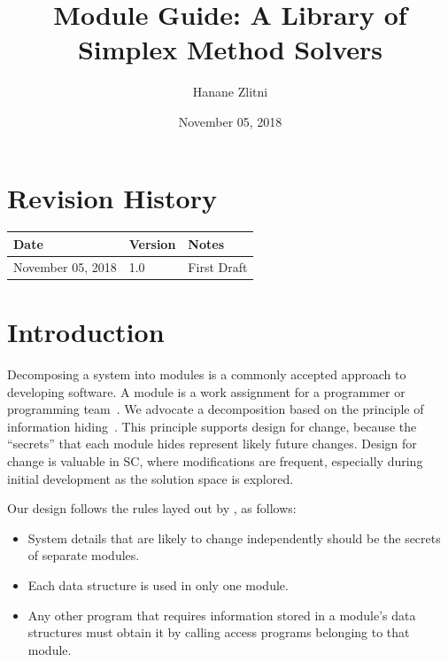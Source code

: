 \documentclass[12pt, titlepage]{article}
\begin{document}
\title{Module Guide: A Library of Simplex Method Solvers} 
\author{Hanane Zlitni}
\date{November 05, 2018}

\maketitle


\section{Revision History}

\begin{tabularx}{\textwidth}{p{3cm}p{2cm}X}
\toprule {\bf Date} & {\bf Version} & {\bf Notes}\\
\midrule
November 05, 2018 & 1.0 & First Draft\\
\bottomrule
\end{tabularx}

\newpage

\tableofcontents

\listoftables

\listoffigures

\newpage


\section{Introduction}

Decomposing a system into modules is a commonly accepted approach to developing
software.  A module is a work assignment for a programmer or programming
team~\citep{ParnasEtAl1984}.  We advocate a decomposition
based on the principle of information hiding~\citep{Parnas1972a}.  This
principle supports design for change, because the ``secrets'' that each module
hides represent likely future changes.  Design for change is valuable in SC,
where modifications are frequent, especially during initial development as the
solution space is explored.  

Our design follows the rules layed out by \citet{ParnasEtAl1984}, as follows:
\begin{itemize}
\item System details that are likely to change independently should be the
  secrets of separate modules.
\item Each data structure is used in only one module.
\item Any other program that requires information stored in a module's data
  structures must obtain it by calling access programs belonging to that module.
\end{itemize}
\end{document}
